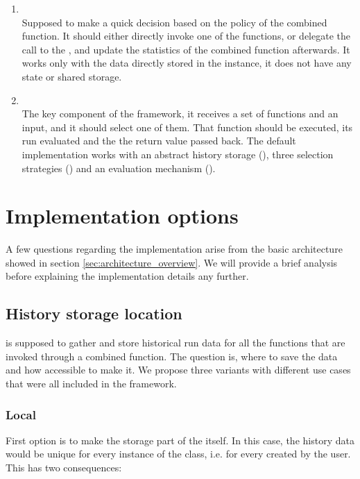 \begin{enumerate}
	\item \textbf{} \\
	Supposed to make a quick decision based on the policy of the combined function. It should either directly invoke one of the functions, or delegate the call to the , and update the statistics of the combined function afterwards. It works only with the data directly stored in the  instance, it does not have any state or shared storage.
	\item \textbf{} \\
	The key component of the framework, it receives a set of functions and an input, and it should select one of them. That function should be executed, its run evaluated and the the return value passed back. The default implementation works with an abstract history storage (), three selection strategies () and an evaluation mechanism ().
\end{enumerate}

\section{Implementation options}

A few questions regarding the implementation arise from the basic architecture showed in section \ref{sec:architecture_overview}. We will provide a brief analysis before explaining the implementation details any further.

\subsection{History storage location}
\label{subsec:storing}

 is supposed to gather and store historical run data for all the functions that are invoked through a combined function. The question is, where to save the data and how accessible to make it. We propose three variants with different use cases that were all included in the framework.

\subsubsection{Local}

First option is to make the storage part of the  itself. In this case, the history data would be unique for every instance of the class, i.e. for every  created by the user. This has two consequences:

